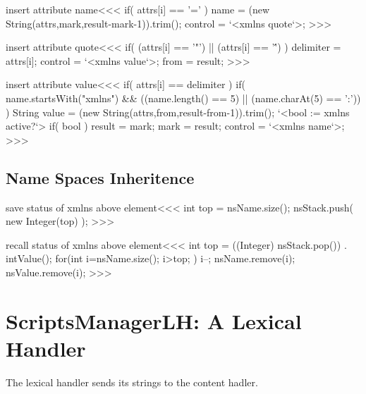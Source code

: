 \documentclass{article}
\begin{document}
\<insert attribute name\><<<
if( attrs[i] == '=' ){
   name = (new String(attrs,mark,result-mark-1)).trim();
   control = `<xmlns quote`>;
}
>>>

\<insert attribute quote\><<<
if( (attrs[i] == '"') || (attrs[i] == '\'') ){
   delimiter = attrs[i];
   control = `<xmlns value`>;
   from = result;
}
>>>

\<insert attribute value\><<<
if( attrs[i] == delimiter ){
   if( name.startsWith("xmlns")
       && ((name.length() == 5) || (name.charAt(5) == ':')) ){
      String value = (new String(attrs,from,result-from-1)).trim();
      `<bool := xmlns active?`>
      if( bool ){ result = mark; }
   }
   mark = result;
   control = `<xmlns name`>;
}
>>>



\subsection{Name Spaces Inheritence}





\<save status of xmlns above element\><<<
int top = nsName.size();
nsStack.push( new Integer(top) );
>>>

\<recall status of xmlns above element\><<<
int top = ((Integer) nsStack.pop()) . intValue();
for(int i=nsName.size(); i>top; ){
  i--;
  nsName.remove(i);
  nsValue.remove(i);
}
>>>

















\section{ScriptsManagerLH: A Lexical Handler}

\label{ScriptsManagerLH}

The lexical handler sends its strings to the content hadler.

\end{document}
